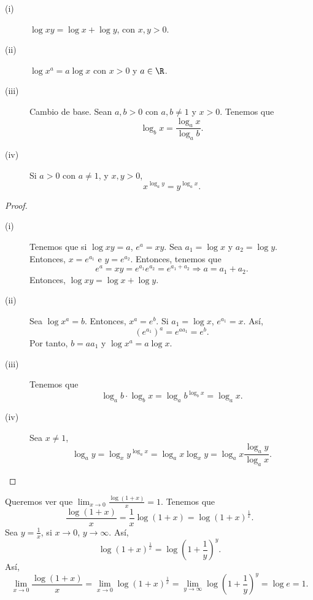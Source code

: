 \begin{fprop}[]
\normalfont 
\begin{description}
\item[(i)] $\displaystyle \log xy = \log x + \log y $, con $\displaystyle x,y > 0 $.
\item[(ii)] $\displaystyle \log x^{a} = a \log x $ con $\displaystyle x > 0 $ y $\displaystyle a \in \R $.
\item[(iii)] Cambio de base. Sean $\displaystyle a,b > 0 $ con $\displaystyle a,b \neq 1 $ y $\displaystyle x > 0 $. Tenemos que
	\[\log_{b}x = \frac{\log_{a}x}{\log_{a}b} .\]
\item[(iv)] Si $\displaystyle a > 0 $ con $\displaystyle a \neq 1 $, y $\displaystyle x, y > 0 $,
	\[x^{\log_{a}y} = y^{\log_{a}x} .\]
\end{description}
\end{fprop}

\begin{proof}
\begin{description}
\item[(i)] Tenemos que si $\displaystyle \log xy = a $, $\displaystyle e^{a} = xy $. Sea $\displaystyle a_{1} = \log x  $ y $\displaystyle a_{2} = \log y $. Entonces, $\displaystyle x = e^{a_{1}} $ e $\displaystyle y = e^{a_{2}} $. Entonces, tenemos que
	\[e^{a} = xy = e^{a_{1}}e^{a_{2}} = e^{a_{1}+a_{2}} \Rightarrow a = a_{1} + a_{2} .\]
Entonces, $\displaystyle \log xy = \log x + \log y $.
\item[(ii)] Sea $\displaystyle \log x^{a} = b $. Entonces, $\displaystyle x^{a} = e^{b} $. Si $\displaystyle a_{1} = \log x $, $\displaystyle e^{a_{1}} = x $. Así, 
	\[\left(e^{a_{1}}\right)^{a} = e^{a a_{1}} = e^{b} .\]
Por tanto, $\displaystyle b = a a_{1} $ y $\displaystyle \log x^{a} = a\log x $.
\item[(iii)] Tenemos que 
	\[\log_{a}b \cdot \log_{b}x = \log_{a}b^{\log_{b}x} = \log_{a}x .\]
\item[(iv)] Sea $\displaystyle x \neq 1 $,
	\[\log_{a}y = \log_{x}y^{\log_{a}x} = \log_{a}x\log_{x}y = \log_{a}x\frac{\log_{a}y}{\log_{a}x} .\] 
\end{description}
\end{proof}

\begin{observation}
\normalfont Queremos ver que $\displaystyle \lim_{x \to 0}\frac{\log\left(1+x\right)}{x} = 1 $. Tenemos que
\[\frac{\log\left(1+x\right)}{x} = \frac{1}{x}\log\left(1+x\right) = \log\left(1+x\right)^{\frac{1}{x}} .\]
Sea $\displaystyle y = \frac{1}{x} $, si $\displaystyle x \to 0 $, $\displaystyle y \to \infty $. Así, 
\[\log\left(1+x\right)^{\frac{1}{x}} = \log\left(1 + \frac{1}{y}\right)^{y} .\]
Así, 
\[\lim_{x \to 0}\frac{\log\left(1+x\right)}{x} = \lim_{x \to 0}\log\left(1+x\right)^{\frac{1}{x}} = \lim_{y \to \infty}\log\left(1+\frac{1}{y}\right)^{y} = \log e = 1 .\]
\end{observation}

